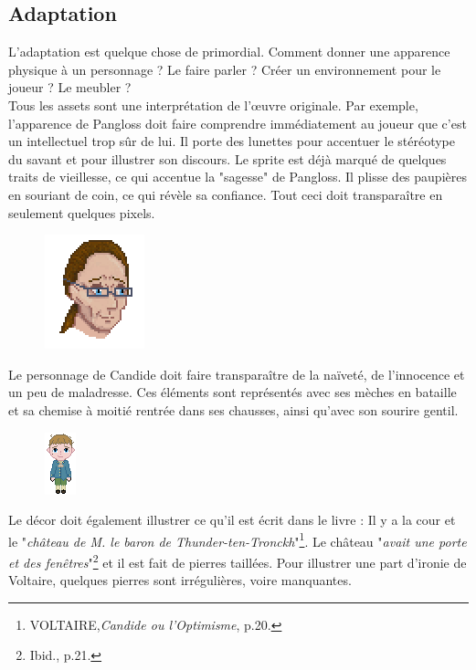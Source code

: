 \documentclass[11pt]{article}
\begin{document}
\subsection{Adaptation}
L'adaptation est quelque chose de primordial. Comment donner une apparence physique à un personnage ? Le faire parler ? Créer un environnement pour le joueur ? Le meubler ?\\ 
Tous les assets sont une interprétation de l'œuvre originale. Par exemple, l'apparence de Pangloss doit faire comprendre immédiatement au joueur que c'est un intellectuel trop sûr de lui. Il porte des lunettes pour accentuer le stéréotype du savant et pour illustrer son discours. Le sprite est déjà marqué de quelques traits de vieillesse, ce qui accentue la "sagesse" de Pangloss. Il plisse des paupières en souriant de coin, ce qui révèle sa confiance. Tout ceci doit transparaître en seulement quelques pixels.
\begin{figure}[H]
\includegraphics[scale=0.8]{panglossHead}
\centering
\end{figure}
Le personnage de Candide doit faire transparaître de la naïveté, de l'innocence et un peu de maladresse. Ces éléments sont représentés avec ses mèches en bataille et sa chemise à moitié rentrée dans ses chausses, ainsi qu'avec son sourire gentil.\\
\begin{figure}[H]
\includegraphics[scale=1.3]{candide}
\centering
\end{figure}
Le décor doit également illustrer ce qu'il est écrit dans le livre : Il y a la cour et le "\textit{château de M. le baron de Thunder-ten-Tronckh}"\footnote{VOLTAIRE,\textit{Candide ou l'Optimisme}, p.20.}. Le château "\textit{avait une porte et des fenêtres}"\footnote{Ibid., p.21.} et il est fait de pierres taillées. Pour illustrer une part d'ironie de Voltaire, quelques pierres sont irrégulières, voire manquantes.
\end{document}
